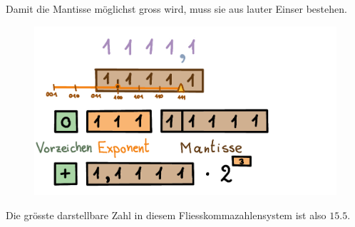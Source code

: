 \begin{beispiel}
Damit die Mantisse möglichst gross wird, muss sie aus lauter Einser bestehen.
\begin{figure}[H]
\centering
\includegraphics[width=0.85\linewidth]{Pictures/groessteZahl3.png}
\end{figure}

Die grösste darstellbare Zahl in diesem Fliesskommazahlensystem ist also \(15.5\).
\end{beispiel}

